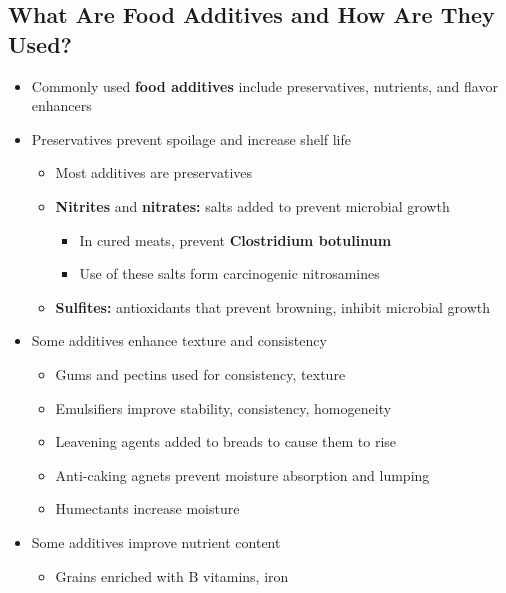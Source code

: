 \documentclass[12pt]{article}
\begin{document}
        \subsection{What Are Food Additives and How Are They Used?}
            \begin{itemize}
                \item Commonly used \textbf{food additives} include preservatives, nutrients, and flavor enhancers
                \item Preservatives prevent spoilage and increase shelf life
                    \begin{itemize}
                        \item Most additives are preservatives
                        \item \textbf{Nitrites} and \textbf{nitrates:} salts added to prevent microbial growth
                            \begin{itemize}
                                \item In cured meats, prevent \textbf{Clostridium botulinum}
                                \item Use of these salts form carcinogenic nitrosamines
                            \end{itemize}
                        \item \textbf{Sulfites:} antioxidants that prevent browning, inhibit microbial growth
                    \end{itemize}
                \item Some additives enhance texture and consistency
                    \begin{itemize}
                        \item Gums and pectins used for consistency, texture
                        \item Emulsifiers improve stability, consistency, homogeneity
                        \item Leavening agents added to breads to cause them to rise
                        \item Anti-caking agnets prevent moisture absorption and lumping
                        \item Humectants increase moisture
                    \end{itemize}
                \item Some additives improve nutrient content
                    \begin{itemize}
                        \item Grains enriched with B vitamins, iron

\end{itemize}
\end{itemize}
\end{document}
